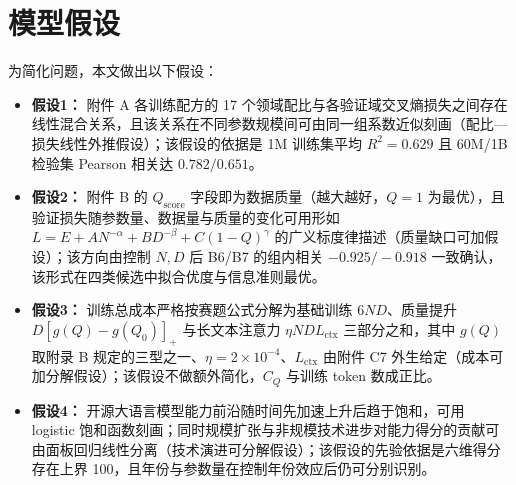 \section{模型假设}

为简化问题，本文做出以下假设：

\begin{itemize}[itemindent=2em]
\item \textbf{假设1：} 附件 A 各训练配方的 17 个领域配比与各验证域交叉熵损失之间存在线性混合关系，且该关系在不同参数规模间可由同一组系数近似刻画（配比—损失线性外推假设）；该假设的依据是 1M 训练集平均 $R^2=0.629$ 且 60M/1B 检验集 Pearson 相关达 $0.782/0.651$。
\item \textbf{假设2：} 附件 B 的 $Q_{\text{score}}$ 字段即为数据质量（越大越好，$Q=1$ 为最优），且验证损失随参数量、数据量与质量的变化可用形如 $L=E+AN^{-\alpha}+BD^{-\beta}+C(1-Q)^{\gamma}$ 的广义标度律描述（质量缺口可加假设）；该方向由控制 $N,D$ 后 B6/B7 的组内相关 $-0.925/-0.918$ 一致确认，该形式在四类候选中拟合优度与信息准则最优。
\item \textbf{假设3：} 训练总成本严格按赛题公式分解为基础训练 $6ND$、质量提升 $D[g(Q)-g(Q_0)]_+$ 与长文本注意力 $\eta NDL_{\text{ctx}}$ 三部分之和，其中 $g(Q)$ 取附录 B 规定的三型之一、$\eta=2\times10^{-4}$、$L_{\text{ctx}}$ 由附件 C7 外生给定（成本可加分解假设）；该假设不做额外简化，$C_Q$ 与训练 token 数成正比。
\item \textbf{假设4：} 开源大语言模型能力前沿随时间先加速上升后趋于饱和，可用 logistic 饱和函数刻画；同时规模扩张与非规模技术进步对能力得分的贡献可由面板回归线性分离（技术演进可分解假设）；该假设的先验依据是六维得分存在上界 100，且年份与参数量在控制年份效应后仍可分别识别。
\end{itemize}
